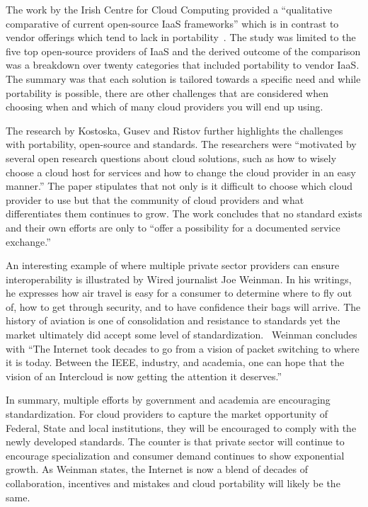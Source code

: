 The work by the Irish Centre for Cloud Computing provided a ``qualitative  comparative  
of current  open-source  IaaS frameworks'' which is in contrast to vendor offerings which
tend to lack in portability~\cite{hid-sp18-518-Comp-study}. The study was limited to the
five top open-source providers of IaaS and the derived outcome of the comparison was a 
breakdown over twenty categories that included portability to vendor IaaS. The summary
was that each solution is tailored towards a specific need and while portability is
possible, there are other challenges that are considered when choosing when and which
of many cloud providers you will end up using.

The research by Kostoska, Gusev and Ristov further highlights the
challenges with portability, open-source and standards. The
researchers were ``motivated by several open research questions about
cloud solutions, such as how to wisely choose a cloud host for
services and how to change the cloud provider in an easy
manner.''\cite{hid-sp18-518-Kostoska-Gusev-Ristov} The paper
stipulates that not only is it difficult to choose which cloud
provider to use but that the community of cloud providers and what
differentiates them continues to grow. The work concludes that no
standard exists and their own efforts are only to ``offer a
possibility for a documented service exchange.''

An interesting example of where multiple private sector providers can ensure 
interoperability is illustrated by Wired journalist Joe Weinman. In his writings, he
expresses how air travel is easy for a consumer to determine where to fly out of, how
to get through security, and to have confidence their bags will arrive. The history of
aviation is one of consolidation and resistance to standards yet the market ultimately 
did accept some level of standardization.~\cite{hid-sp18-518-Wired} Weinman concludes 
with ``The Internet took decades to go from a vision of packet switching to where it is 
today.  Between the IEEE, industry, and academia, one can hope that the vision of an 
Intercloud is now getting the attention it deserves.''

In summary, multiple efforts by government and academia are encouraging standardization. 
For cloud providers to capture the market opportunity of Federal, State and local 
institutions, they will be encouraged to comply with the newly developed standards. The 
counter is that private sector will continue to encourage specialization and consumer
demand continues to show exponential growth. As Weinman states, the Internet is now a 
blend of decades of collaboration, incentives and mistakes and cloud portability will
likely be the same.

